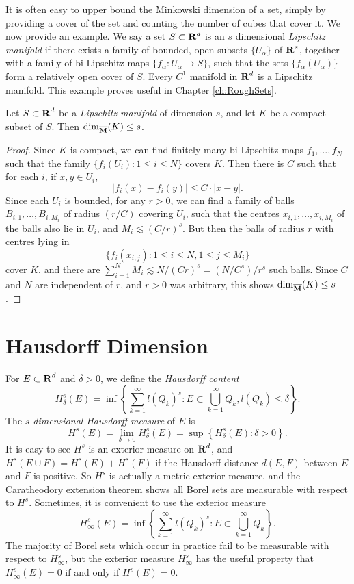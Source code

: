 It is often easy to upper bound the Minkowski dimension of a set, simply by providing a cover of the set and counting the number of cubes that cover it. We now provide an example. We say a set $S \subset \operatorname{\mathbf{R}}^d$ is an $s$ dimensional \emph{Lipschitz manifold} if there exists a family of bounded, open subsets $\{ U_\alpha \}$ of $\operatorname{\mathbf{R}}^s$, together with a family of bi-Lipschitz maps $\{ f_\alpha: U_\alpha \to S \}$, such that the sets $\{ f_\alpha(U_\alpha) \}$ form a relatively open cover of $S$. Every $C^1$ manifold in $\operatorname{\mathbf{R}}^d$ is a Lipschitz manifold. This example proves useful in Chapter \ref{ch:RoughSets}.

\begin{theorem} \label{ManifoldDimensionThm}
	Let $S \subset \operatorname{\mathbf{R}}^d$ be a \emph{Lipschitz manifold} of dimension $s$, and let $K$ be a compact subset of $S$. Then $\operatorname{\dim_{\overline{\mathbf{M}}}}(K) \leq s$.
\end{theorem}
\begin{proof}
	Since $K$ is compact, we can find finitely many bi-Lipschitz maps $f_1, \dots, f_N$ such that the family $\{ f_i(U_i) : 1 \leq i \leq N \}$ covers $K$. Then there is $C$ such that for each $i$, if $x,y \in U_i$,
	\[ |f_i(x) - f_i(y)| \leq C \cdot |x-y|. \]
	Since each $U_i$ is bounded, for any $r > 0$, we can find a family of balls $B_{i,1}, \dots, B_{i,M_i}$ of radius $(r/C)$ covering $U_i$, such that the centres $x_{i,1}, \dots, x_{i,M_i}$ of the balls also lie in $U_i$, and $M_i \lesssim (C/r)^s$. But then the balls of radius $r$ with centres lying in
	\[ \{ f_i(x_{i,j}) : 1 \leq i \leq N, 1 \leq j \leq M_i \} \]
	cover $K$, and there are $\sum_{i = 1}^N M_i \lesssim N/(Cr)^s = (N/C^s) / r^s$ such balls. Since $C$ and $N$ are independent of $r$, and $r > 0$ was arbitrary, this shows $\operatorname{\dim_{\overline{\mathbf{M}}}}(K) \leq s$.
\end{proof}

\section{Hausdorff Dimension}

For $E \subset \operatorname{\mathbf{R}}^d$ and $\delta > 0$, we define the \emph{Hausdorff content}
%
\[ H_\delta^s(E) = \inf \left\{ \sum_{k = 1}^\infty l(Q_k)^s : E \subset \bigcup_{k = 1}^\infty Q_k, l(Q_k) \leq \delta \right\}. \]
%
The \emph{$s$-dimensional Hausdorff measure} of $E$ is
%
\[ H^s(E) = \lim_{\delta \to 0} H_\delta^s(E) = \sup \left\{ H^s_\delta(E) : \delta > 0 \right\}. \]
%
It is easy to see $H^s$ is an exterior measure on $\operatorname{\mathbf{R}}^d$, and $H^s(E \cup F) = H^s(E) + H^s(F)$ if the Hausdorff distance $d(E,F)$ between $E$ and $F$ is positive. So $H^s$ is actually a metric exterior measure, and the Caratheodory extension theorem shows all Borel sets are measurable with respect to $H^s$. Sometimes, it is convenient to use the exterior measure
%
\[ H^s_\infty(E) = \inf \left\{ \sum_{k = 1}^\infty l(Q_k)^s : E \subset \bigcup_{k = 1}^\infty Q_k \right\}. \]
%
The majority of Borel sets which occur in practice fail to be measurable with respect to $H^s_\infty$, but the exterior measure $H^s_\infty$ has the useful property that $H^s_\infty(E) = 0$ if and only if $H^s(E) = 0$.

